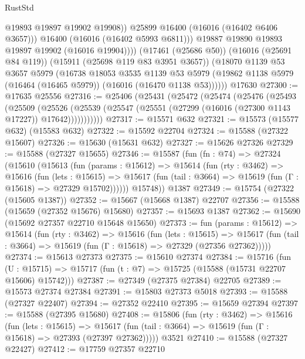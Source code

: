 \begin{lexlean}{RustStd}
\begin{coremodule}
                    @19893
                    @19897
                    @19902
                    @19908))
                @25899
                @16400
                (@16016 (@16402 @6406 @3657)))
              @16400
              (@16016 (@16402 @5993 @6811)))
            @19887
            @19890
            @19893
            @19897
            @19902
            (@16016 @19904))))
      (@17461 (@25686 @50))
      (@16016 (@25691 @84 @119))
      (@15911 (@25698 @119 @83 @3951 @3657))
      (@18070
        @1139
        @53
        @3657
        @5979
        (@16738
          @18053
          @3535
          @1139
          @53
          @5979
          (@19862 @1138 @5979 (@16464 (@16465 @5979)) (@16016 (@16470 @1138 @53))))))
    @17630
@27300 := @17635 @25556
@27316 := @25406
    (@25431
      (@25472
        (@25474
          (@25476
            (@25493
              (@25509
                (@25526
                  (@25539 (@25547 (@25551 (@27299 (@16016 (@27300 @1143 @17227)) @17642)))))))))))
@27317 := @15571 @632
@27321 := @15573 (@15577 @632) (@15583 @632)
@27322 := @15592 @22704
@27324 := @15588 (@27322 @15607)
@27326 := @15630 (@15631 @632)
@27327 := @15626 @27326
@27329 := @15588 (@27327 @15655)
@27346 := @15587
    (fun (fn : @74) =>
    @27324
      (@15610
        (@15613
          (fun (params : @15612) =>
          @15614
            (fun (rty : @3462) =>
            @15616
              (fun (lets : @15615) =>
              @15617 (fun (tail : @3664) => @15619 (fun (Γ : @15618) => @27329 @15702))))))
        @15748))
    @1387
@27349 := @15754 (@27322 (@15605 @1387))
@27352 := @15667 (@15668 @1387) @22707
@27356 := @15588 (@15659 (@27352 @15676) @15680)
@27357 := @15693 @1387
@27362 := @15690 (@15692 @27357 @22710 @15648 @15650)
@27373 := fun (params : @15612) =>
  @15614
    (fun (rty : @3462) =>
    @15616
      (fun (lets : @15615) =>
      @15617 (fun (tail : @3664) => @15619 (fun (Γ : @15618) => @27329 (@27356 @27362)))))
@27374 := @15613 @27373
@27375 := @15610 @27374
@27384 := @15716
    (fun (U : @15715) => @15717 (fun (t : @7) => @15725 (@15588 (@15731 @22707 @15606) @15742)))
@27387 := @27349 (@27375 @27384) @22705
@27389 := @15573 @27374 @27384
@27391 := @15803 @27373 @5018
@27393 := @15588 (@27327 @22407)
@27394 := @27352 @22410
@27395 := @15659 @27394
@27397 := @15588 (@27395 @15680)
@27408 := @15806
    (fun (rty : @3462) =>
    @15616
      (fun (lets : @15615) =>
      @15617 (fun (tail : @3664) => @15619 (fun (Γ : @15618) => @27393 (@27397 @27362)))))
    @3521
@27410 := @15588 (@27327 @22427)
@27412 := @17759 @27357 @22710

\end{coremodule}
\end{lexlean}
